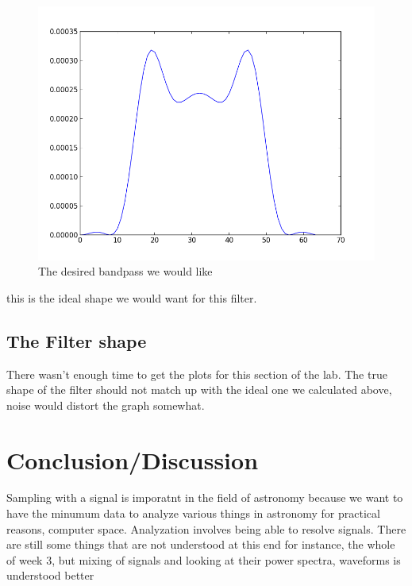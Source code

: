 \documentclass[12 pt]{article}
\begin{document}
\begin{figure}[H]
\center
\includegraphics[scale=0.4]{desiredbandpass.png}
\caption{The desired bandpass we would like}
\label{bandpass}
\end{figure}
 this is the ideal shape we would want for this filter.

\subsection{The Filter shape}
There wasn't enough time to get the plots for this section of the lab.
The true shape of the filter should not match up with the ideal one we
calculated above, noise would distort the graph somewhat.


\section{Conclusion/Discussion}
Sampling with a signal is imporatnt in the field of astronomy because we
want to have the minumum data to analyze various things in astronomy for
practical reasons, computer space. Analyzation involves being able to
resolve signals. There are still some things that are not understood at
this end for instance, the whole of week 3, but mixing of signals and
looking at their power spectra, waveforms is understood better 
\end{document}
